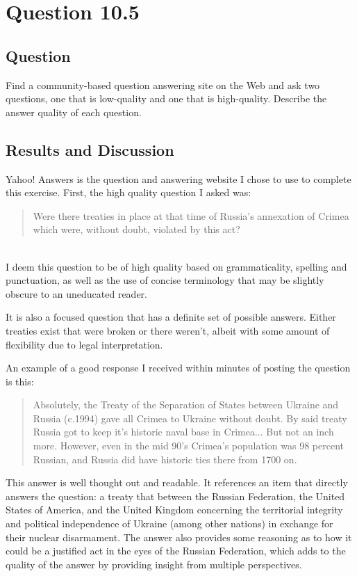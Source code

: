 \section{Question 10.5}

\subsection{Question}
Find a community-based question answering site on the Web and ask two
questions, one that is low-quality and one that is high-quality. Describe the answer quality of each question.

\subsection{Results and Discussion}
Yahoo! Answers is the question and answering website I chose to use to complete this exercise.  First, the high quality question I asked was:\\

\blockquote{Were there treaties in place at that time of Russia's annexation of Crimea which were, without doubt, violated by this act?}\\

I deem this question to be of high quality based on grammaticality, spelling and punctuation, as well as the use of concise terminology that may be slightly obscure to an uneducated reader.

It is also a focused question that has a definite set of possible answers.  Either treaties exist that were broken or there weren't, albeit with some amount of flexibility due to legal interpretation.

An example of a good response I received within minutes of posting the question is this:

\blockquote{Absolutely, the Treaty of the Separation of States between Ukraine and Russia (c.1994) gave all Crimea to Ukraine without doubt. By said treaty Russia got to keep it's historic naval base in Crimea... But not an inch more.  However, even in the mid 90's Crimea's population was 98 percent Russian, and Russia did have historic ties there from 1700 on.}

This answer is well thought out and readable.  It references an item that directly answers the question: a treaty that between the Russian Federation, the United States of America, and the United Kingdom concerning the territorial integrity and political independence of Ukraine (among other nations) in exchange for their nuclear disarmament.  The answer also provides some reasoning as to how it could be a justified act in the eyes of the Russian Federation, which adds to the quality of the answer by providing insight from multiple perspectives.

